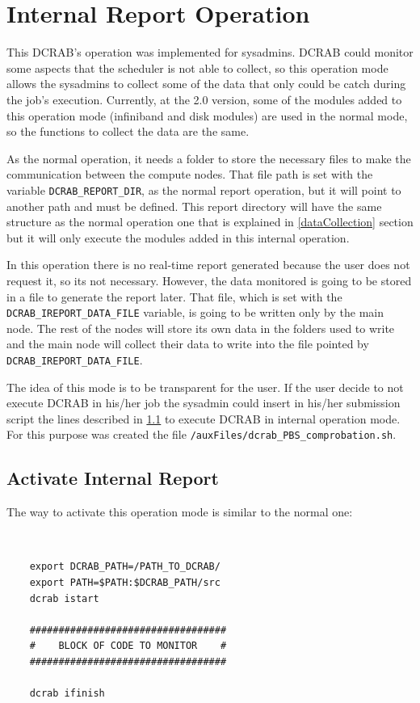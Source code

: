 \documentclass[10pt,a4paper]{report}
\begin{document}
\chapter{Internal Report Operation}
\label{internalReportChapter}
This DCRAB's operation was implemented for sysadmins. DCRAB could monitor some aspects that the scheduler is not able to collect, so this operation mode allows the sysadmins to collect some of the data that only could be catch during the job's execution. Currently, at the 2.0 version, some of the modules added to this operation mode (infiniband and disk modules) are used in the normal mode, so the functions to collect the data are the same.

As the normal operation, it needs a folder to store the necessary files to make the communication between the compute nodes. That file path is set with the variable \verb+DCRAB_REPORT_DIR+, as the normal report operation, but it will point to another path and must be defined. This report directory will have the same structure as the normal operation one that is explained in \ref{dataCollection} section but it will only execute the modules added in this internal operation.

In this operation there is no real-time report generated because the user does not request it, so its not necessary. However, the data monitored is going to be stored in a file to generate the report later. That file, which is set with the \verb+DCRAB_IREPORT_DATA_FILE+ variable, is going to be written only by the main node. The rest of the nodes will store its own data in the folders used to write and the main node will collect their data to write into the file pointed by \verb+DCRAB_IREPORT_DATA_FILE+.

The idea of this mode is to be transparent for the user. If the user decide to not execute DCRAB in his/her job the sysadmin could insert in his/her submission script the lines described in \ref{internalReport} to execute DCRAB in internal operation mode. For this purpose was created the file \texttt{/auxFiles/dcrab\_PBS\_comprobation.sh}.

\section{Activate Internal Report}
\label{internalReport}
The way to activate this operation mode is similar to the normal one:

\ \

\begin{verbatim}
    export DCRAB_PATH=/PATH_TO_DCRAB/
    export PATH=$PATH:$DCRAB_PATH/src
    dcrab istart

    ##################################
    #    BLOCK OF CODE TO MONITOR    #
    ##################################

    dcrab ifinish
\end{verbatim}
\end{document}
